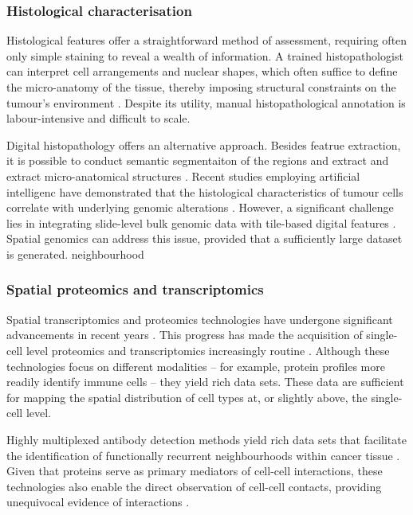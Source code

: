\subsubsection*{Histological characterisation}

Histological features offer a straightforward method of assessment, requiring often only simple staining to reveal a wealth of information. A trained histopathologist can interpret cell arrangements and nuclear shapes, which often suffice to define the micro-anatomy of the tissue, thereby imposing structural constraints on the tumour's environment . Despite its utility, manual histopathological annotation is labour-intensive and difficult to scale.

Digital histopathology offers an alternative approach. Besides featrue extraction, it is possible to conduct semantic segmentaiton of the regions and extract and extract micro-anatomical structures \parencite{Kiemen2020-dc}. Recent studies employing artificial intelligenc have demonstrated that the histological characteristics of tumour cells correlate with underlying genomic alterations \parencite{Fu2020-cp, Kather2020-bt}. However, a significant challenge lies in integrating slide-level bulk genomic data with tile-based digital features \parencite{Shmatko2022-to}. Spatial genomics can address this issue, provided that a sufficiently large dataset is generated.
neighbourhood
\subsubsection*{Spatial proteomics and transcriptomics}

Spatial transcriptomics and proteomics technologies have undergone significant advancements in recent years \parencite{Lewis2021-ic, Mund2022-kf}. This progress has made the acquisition of single-cell level proteomics and transcriptomics increasingly routine . Although these technologies focus on different modalities -- for example, protein profiles more readily identify immune cells -- they yield rich data sets. These data are sufficient for mapping the spatial distribution of cell types at, or slightly above, the single-cell level.

Highly multiplexed antibody detection methods yield rich data sets that facilitate the identification of functionally recurrent neighbourhoods within cancer tissue \parencite{Danenberg2022-zb, Jackson2020-em, Nirmal2022-sq, Schurch2020-lp, Wang2023-bo}. Given that proteins serve as primary mediators of cell-cell interactions, these technologies also enable the direct observation of cell-cell contacts, providing unequivocal evidence of interactions \parencite{Nirmal2022-sq, Wang2023-bo}.


